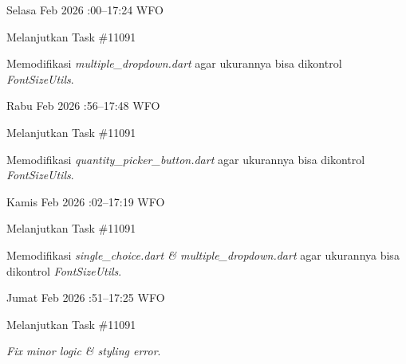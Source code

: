 \begin{logtable}
    {
        Selasa  Feb 2026 :00--17:24 \linebreak
        WFO
    }{
        \begin{loglist}
            \item Melanjutkan Task \#11091
        \end{loglist}
    }{
        \begin{logwork}
            \item Memodifikasi \textit{multiple\_dropdown.dart} agar ukurannya bisa dikontrol
            \textit{FontSizeUtils}.
        \end{logwork}
    }

    {
        Rabu  Feb 2026 :56--17:48 \linebreak
        WFO
    }{
        \begin{loglist}
            \item Melanjutkan Task \#11091
        \end{loglist}
    }{
        \begin{logwork}
            \item Memodifikasi \textit{quantity\_picker\_button.dart} agar ukurannya bisa
            dikontrol \textit{FontSizeUtils}.
        \end{logwork}
    }

    {
        Kamis  Feb 2026 :02--17:19 \linebreak
        WFO
    }{
        \begin{loglist}
            \item Melanjutkan Task \#11091
        \end{loglist}
    }{
        \begin{logwork}
            \item Memodifikasi \textit{single\_choice.dart \& multiple\_dropdown.dart} agar
            ukurannya bisa dikontrol \textit{FontSizeUtils}.
        \end{logwork}
    }

    {
        Jumat  Feb 2026 :51--17:25 \linebreak
        WFO
    }{
        \begin{loglist}
            \item Melanjutkan Task \#11091
        \end{loglist}
    }{
        \begin{logwork}
            \item \textit{Fix minor logic \& styling error}.
        \end{logwork}
    }


\end{logtable}
